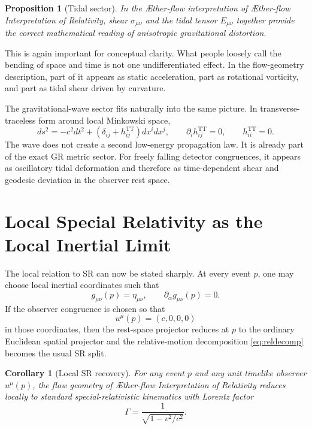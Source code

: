 \documentclass[11pt]{article}
\newcommand{\Aflow}{\AE{}ther-flow}
\newcommand{\TheoryName}{\Aflow{} Interpretation of Relativity}
\newtheorem{proposition}{Proposition}
\newtheorem{corollary}{Corollary}
\begin{document}
\begin{proposition}[Tidal sector]
In the \Aflow{} interpretation of \TheoryName{}, shear \(\sigma_{\mu\nu}\) and the tidal tensor \(E_{\mu\nu}\) together provide the correct mathematical reading of anisotropic gravitational distortion.
\end{proposition}

This is again important for conceptual clarity. What people loosely call the bending of space and time is not one undifferentiated effect. In the flow-geometry description, part of it appears as static acceleration, part as rotational vorticity, and part as tidal shear driven by curvature.

The gravitational-wave sector fits naturally into the same picture. In transverse-traceless form around local Minkowski space,
\begin{equation}
ds^2
=
-c^2dt^2
+
\left(\delta_{ij}+h^{\mathrm{TT}}_{ij}\right)dx^i dx^j,
\qquad
\partial_i h^{\mathrm{TT}}_{ij}=0,
\qquad
h^{\mathrm{TT}}_{ii}=0.
\label{eq:ttmetric}
\end{equation}
The wave does not create a second low-energy propagation law. It is already part of the exact GR metric sector. For freely falling detector congruences, it appears as oscillatory tidal deformation and therefore as time-dependent shear and geodesic deviation in the observer rest space.

\section{Local Special Relativity as the Local Inertial Limit}

The local relation to SR can now be stated sharply. At every event \(p\), one may choose local inertial coordinates such that
\begin{equation}
g_{\mu\nu}(p)=\eta_{\mu\nu},
\qquad
\partial_\alpha g_{\mu\nu}(p)=0.
\label{eq:localinertial}
\end{equation}
If the observer congruence is chosen so that
\begin{equation}
u^\mu(p)=(c,0,0,0)
\label{eq:localobserver}
\end{equation}
in those coordinates, then the rest-space projector reduces at \(p\) to the ordinary Euclidean spatial projector and the relative-motion decomposition \eqref{eq:reldecomp} becomes the usual SR split.

\begin{corollary}[Local SR recovery]
For any event \(p\) and any unit timelike observer \(u^\mu(p)\), the flow geometry of \TheoryName{} reduces locally to standard special-relativistic kinematics with Lorentz factor
\begin{equation}
\Gamma=\frac{1}{\sqrt{1-v^2/c^2}}.
\label{eq:localsr}
\end{equation}
\end{corollary}
\end{document}
